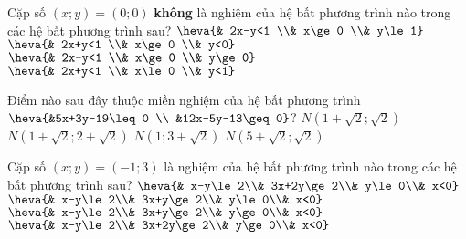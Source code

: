 \begin{ex}%
	Cặp số $(x;y)=(0;0)$ \textbf{không} là nghiệm của hệ bất phương trình nào trong các hệ bất phương trình sau?
	\def\dotEX{}	
	\choice
	{$\heva{& 2x-y<1 \\& x\ge 0 \\& y\le 1}$}
	{\True $\heva{& 2x+y<1 \\& x\ge 0 \\& y<0}$}
	{$\heva{& 2x-y<1 \\& x\ge 0 \\& y\ge 0}$}
	{$\heva{& 2x+y<1 \\& x\le 0 \\& y<1}$}
\end{ex}

\begin{ex}%
	Điểm nào sau đây thuộc miền nghiệm của hệ bất phương trình $\heva{&5x+3y-19\leq 0 \\ &12x-5y-13\geq 0}$?
	\choice
	{\True $N(1+\sqrt{2};\sqrt{2})$}
	{$N(1+\sqrt{2};2+\sqrt{2})$}
	{$N(1;3+\sqrt{2})$}
	{$N(5+\sqrt{2};\sqrt{2})$}
\end{ex}

\begin{ex}%
	Cặp số $(x;y)=(-1;3)$ là nghiệm của hệ bất phương trình nào trong các hệ bất phương trình sau?	
	\def\dotEX{}
	\choice
	{$\heva{& x-y\le 2\\& 3x+2y\ge 2\\& y\le 0\\& x<0}$}
	{$\heva{& x-y\le 2\\& 3x+y\ge 2\\& y\le 0\\& x<0}$}
	{$\heva{& x-y\le 2\\& 3x+y\ge 2\\& y\ge 0\\& x<0}$}
	{\True $\heva{& x-y\le 2\\& 3x+2y\ge 2\\& y\ge 0\\& x<0}
		$}
\end{ex}

